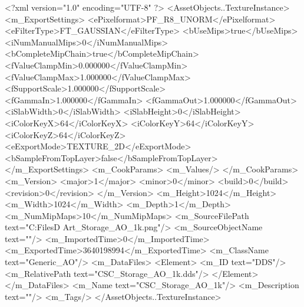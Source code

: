 <?xml version="1.0" encoding="UTF-8" ?>
<AssetObjects..TextureInstance>
	<m_ExportSettings>
		<ePixelformat>PF_R8_UNORM</ePixelformat>
		<eFilterType>FT_GAUSSIAN</eFilterType>
		<bUseMips>true</bUseMips>
		<iNumManualMips>0</iNumManualMips>
		<bCompleteMipChain>true</bCompleteMipChain>
		<fValueClampMin>0.000000</fValueClampMin>
		<fValueClampMax>1.000000</fValueClampMax>
		<fSupportScale>1.000000</fSupportScale>
		<fGammaIn>1.000000</fGammaIn>
		<fGammaOut>1.000000</fGammaOut>
		<iSlabWidth>0</iSlabWidth>
		<iSlabHeight>0</iSlabHeight>
		<iColorKeyX>64</iColorKeyX>
		<iColorKeyY>64</iColorKeyY>
		<iColorKeyZ>64</iColorKeyZ>
		<eExportMode>TEXTURE_2D</eExportMode>
		<bSampleFromTopLayer>false</bSampleFromTopLayer>
	</m_ExportSettings>
	<m_CookParams>
		<m_Values/>
	</m_CookParams>
	<m_Version>
		<major>1</major>
		<minor>0</minor>
		<build>0</build>
		<revision>0</revision>
	</m_Version>
	<m_Height>1024</m_Height>
	<m_Width>1024</m_Width>
	<m_Depth>1</m_Depth>
	<m_NumMipMaps>10</m_NumMipMaps>
	<m_SourceFilePath text="C:\Users\Shadow\Desktop\Working Files\3D Art\Textures\CSC_Storage_AO_1k.png"/>
	<m_SourceObjectName text=""/>
	<m_ImportedTime>0</m_ImportedTime>
	<m_ExportedTime>3640198994</m_ExportedTime>
	<m_ClassName text="Generic_AO"/>
	<m_DataFiles>
		<Element>
			<m_ID text="DDS"/>
			<m_RelativePath text="CSC_Storage_AO_1k.dds"/>
		</Element>
	</m_DataFiles>
	<m_Name text="CSC_Storage_AO_1k"/>
	<m_Description text=""/>
	<m_Tags/>
</AssetObjects..TextureInstance>

